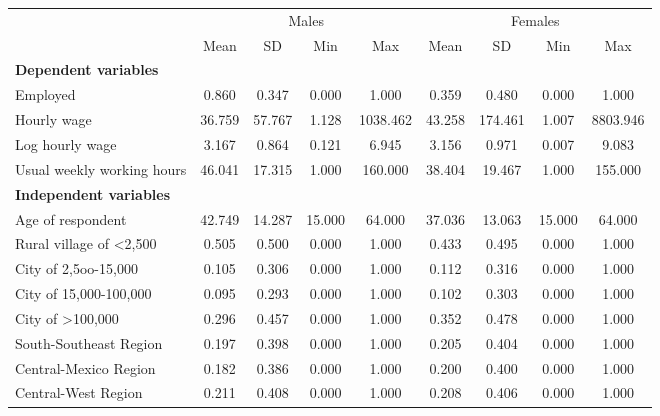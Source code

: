 \begin{table}[h!]
\begin{center}
{ \def\sym#1{\ifmmode^{#1}\else\(^{#1}\)\fi} \begin{tabular}{l*{2}{cccc}}
\toprule
                    &\multicolumn{4}{c}{Males}                          &\multicolumn{4}{c}{Females}                        \\
                    &        Mean&          SD&         Min&         Max&        Mean&          SD&         Min&         Max\\
\midrule
\textbf{Dependent variables} &&&&&&&& \\
Employed            &       0.860&       0.347&       0.000&       1.000&       0.359&       0.480&       0.000&       1.000\\
Hourly wage           &      36.759&      57.767&       1.128&    1038.462&      43.258&     174.461&       1.007&    8803.946\\
Log hourly wage     &       3.167&       0.864&       0.121&       6.945&       3.156&       0.971&       0.007&       9.083\\
Usual weekly working hours&      46.041&      17.315&       1.000&     160.000&      38.404&      19.467&       1.000&     155.000\\
\textbf{Independent variables} &&&&&&&& \\
Age of respondent   &      42.749&      14.287&      15.000&      64.000&      37.036&      13.063&      15.000&      64.000\\
Rural village of <2,500&       0.505&       0.500&       0.000&       1.000&       0.433&       0.495&       0.000&       1.000\\
City of 2,5oo-15,000&       0.105&       0.306&       0.000&       1.000&       0.112&       0.316&       0.000&       1.000\\
City of 15,000-100,000&       0.095&       0.293&       0.000&       1.000&       0.102&       0.303&       0.000&       1.000\\
City of >100,000    &       0.296&       0.457&       0.000&       1.000&       0.352&       0.478&       0.000&       1.000\\
South-Southeast Region&       0.197&       0.398&       0.000&       1.000&       0.205&       0.404&       0.000&       1.000\\
Central-Mexico Region&       0.182&       0.386&       0.000&       1.000&       0.200&       0.400&       0.000&       1.000\\
Central-West Region &       0.211&       0.408&       0.000&       1.000&       0.208&       0.406&       0.000&       1.000\\

\end{tabular}}
\end{center}
\end{table}
